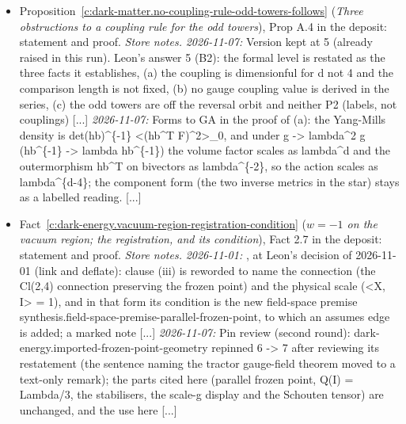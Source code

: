 \documentclass[11pt]{article}
\theoremstyle{definition}
\theoremstyle{plain}
\begin{document}
\begin{itemize}
\item Proposition~\ref{c:dark-matter.no-coupling-rule-odd-towers-follows} (\emph{Three obstructions to a coupling rule for the odd towers}), Prop A.4 in the deposit: statement and proof. \emph{Store notes.} \emph{2026-11-07:} Version kept at 5 (already raised in this run). Leon's answer 5 (B2): the formal level is restated as the three facts it establishes, (a) the coupling is dimensionful for d not 4 and the comparison length is not fixed, (b) no gauge coupling value is derived in the series, (c) the odd towers are off the reversal orbit and neither P2 (labels, not couplings) [...] \emph{2026-11-07:} Forms to GA in the proof of (a): the Yang-Mills density is det(hb)\^{}\{-1\} <(hb\^{}T F)\^{}2>\_0, and under g -> lambda\^{}2 g (hb\^{}\{-1\} -> lambda hb\^{}\{-1\}) the volume factor scales as lambda\^{}d and the outermorphism hb\^{}T on bivectors as lambda\^{}\{-2\}, so the action scales as lambda\^{}\{d-4\}; the component form (the two inverse metrics in the star) stays as a labelled reading. [...]
\item Fact~\ref{c:dark-energy.vacuum-region-registration-condition} (\emph{$w = -1$ on the vacuum region; the registration, and its condition}), Fact 2.7 in the deposit: statement and proof. \emph{Store notes.} \emph{2026-11-01:} , at Leon's decision of 2026-11-01 (link and deflate): clause (iii) is reworded to name the connection (the Cl(2,4) connection preserving the frozen point) and the physical scale (<X, I> = 1), and in that form its condition is the new field-space premise synthesis.field-space-premise-parallel-frozen-point, to which an assumes edge is added; a marked note [...] \emph{2026-11-07:} Pin review (second round): dark-energy.imported-frozen-point-geometry repinned 6 -> 7 after reviewing its restatement (the sentence naming the tractor gauge-field theorem moved to a text-only remark); the parts cited here (parallel frozen point, Q(I) = Lambda/3, the stabilisers, the scale-g display and the Schouten tensor) are unchanged, and the use here [...]
\end{itemize}
\end{document}
